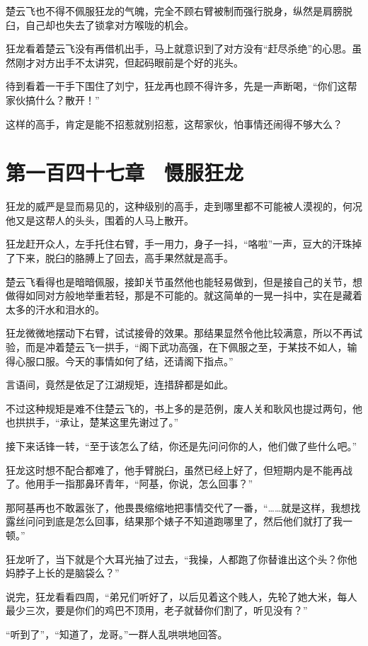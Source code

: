 楚云飞也不得不佩服狂龙的气魄，完全不顾右臂被制而强行脱身，纵然是肩膀脱臼，自己却也失去了锁拿对方喉咙的机会。

狂龙看着楚云飞没有再借机出手，马上就意识到了对方没有“赶尽杀绝”的心思。虽然刚才对方出手不太讲究，但起码眼前是个好的兆头。

待到看着一干手下围住了刘宁，狂龙再也顾不得许多，先是一声断喝，“你们这帮家伙搞什么？散开！”

这样的高手，肯定是能不招惹就别招惹，这帮家伙，怕事情还闹得不够大么？

\section{第一百四十七章　慑服狂龙}

狂龙的威严是显而易见的，这种级别的高手，走到哪里都不可能被人漠视的，何况他又是这帮人的头头，围着的人马上散开。

狂龙赶开众人，左手托住右臂，手一用力，身子一抖，“咯啦”一声，豆大的汗珠掉了下来，脱臼的胳膊上了回去，高手果然就是高手。

楚云飞看得也是暗暗佩服，接卸关节虽然他也能轻易做到，但是接自己的关节，想做得如同对方般地举重若轻，那是不可能的。就这简单的一晃一抖中，实在是藏着太多的汗水和泪水的。

狂龙微微地摆动下右臂，试试接骨的效果。那结果显然令他比较满意，所以不再试验，而是冲着楚云飞一拱手，“阁下武功高强，在下佩服之至，于某技不如人，输得心服口服。今天的事情如何了结，还请阁下指点。”

言语间，竟然是依足了江湖规矩，连措辞都是如此。

不过这种规矩是难不住楚云飞的，书上多的是范例，废人关和耿风也提过两句，他也拱拱手，“承让，楚某这里先谢过了。”

接下来话锋一转，“至于该怎么了结，你还是先问问你的人，他们做了些什么吧。”

狂龙这时想不配合都难了，他手臂脱臼，虽然已经上好了，但短期内是不能再战了。他用手一指那鼻环青年，“阿基，你说，怎么回事？”

那阿基再也不敢嚣张了，他畏畏缩缩地把事情交代了一番，“……就是这样，我想找露丝问问到底是怎么回事，结果那个婊子不知道跑哪里了，然后他们就打了我一顿。”

狂龙听了，当下就是个大耳光抽了过去，“我操，人都跑了你替谁出这个头？你他妈脖子上长的是脑袋么？”

说完，狂龙看看四周，“弟兄们听好了，以后见着这个贱人，先轮了她大米，每人最少三次，要是你们的鸡巴不顶用，老子就替你们割了，听见没有？”

“听到了”，“知道了，龙哥。”一群人乱哄哄地回答。

